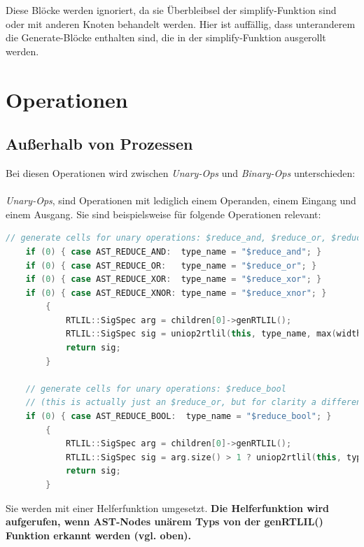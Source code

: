 \documentclass[11pt]{report}
\begin{document}
Diese Blöcke werden ignoriert, da sie Überbleibsel der simplify-Funktion sind oder mit anderen Knoten behandelt werden. Hier ist auffällig, dass unteranderem die Generate-Blöcke enthalten sind, die in der simplify-Funktion ausgerollt werden.
\section{Operationen}
\subsection{Außerhalb von Prozessen}
Bei diesen Operationen wird zwischen \textit{Unary-Ops} und \textit{Binary-Ops} unterschieden:
\\
\\
\textit{Unary-Ops}, sind Operationen mit lediglich einem Operanden, einem Eingang und einem Ausgang. 
Sie sind beispielsweise für folgende Operationen relevant:
\begin{lstlisting}[language=C++]
	// generate cells for unary operations: $reduce_and, $reduce_or, $reduce_xor, $reduce_xnor
	if (0) { case AST_REDUCE_AND:  type_name = "$reduce_and"; }
	if (0) { case AST_REDUCE_OR:   type_name = "$reduce_or"; }
	if (0) { case AST_REDUCE_XOR:  type_name = "$reduce_xor"; }
	if (0) { case AST_REDUCE_XNOR: type_name = "$reduce_xnor"; }
		{
			RTLIL::SigSpec arg = children[0]->genRTLIL();
			RTLIL::SigSpec sig = uniop2rtlil(this, type_name, max(width_hint, 1), arg);
			return sig;
		}

	// generate cells for unary operations: $reduce_bool
	// (this is actually just an $reduce_or, but for clarity a different cell type is used)
	if (0) { case AST_REDUCE_BOOL:  type_name = "$reduce_bool"; }
		{
			RTLIL::SigSpec arg = children[0]->genRTLIL();
			RTLIL::SigSpec sig = arg.size() > 1 ? uniop2rtlil(this, type_name, max(width_hint, 1), arg) : arg;
			return sig;
		}
\end{lstlisting}
Sie werden mit einer Helferfunktion umgesetzt.
\textbf{Die Helferfunktion wird aufgerufen, wenn AST-Nodes unärem Typs von der genRTLIL() Funktion erkannt werden (vgl. oben).}
\end{document}
